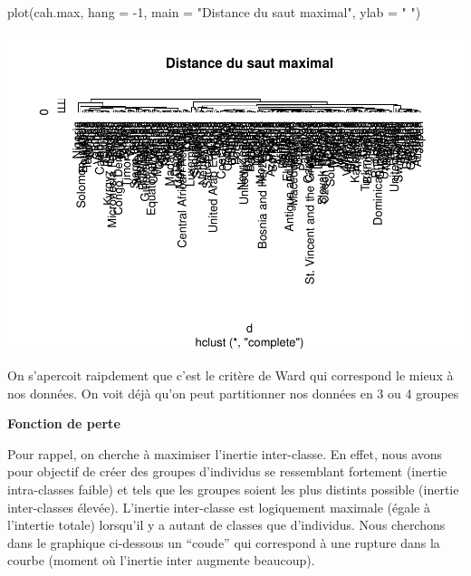 \documentclass[
]{article}
\newenvironment{Shaded}{}{}
\newcommand{\AttributeTok}[1]{#1}
\newcommand{\DecValTok}[1]{#1}
\newcommand{\FunctionTok}[1]{#1}
\newcommand{\NormalTok}[1]{#1}
\newcommand{\SpecialCharTok}[1]{\textcolor[rgb]{0.00,0.50,0.50}{#1}}
\newcommand{\StringTok}[1]{\textcolor[rgb]{0.00,0.50,0.50}{#1}}
\begin{document}
\begin{Shaded}
\begin{Highlighting}[]
\FunctionTok{plot}\NormalTok{(cah.max, }\AttributeTok{hang =} \SpecialCharTok{{-}}\DecValTok{1}\NormalTok{, }\AttributeTok{main =} \StringTok{"Distance du saut maximal"}\NormalTok{, }\AttributeTok{ylab =} \StringTok{" "}\NormalTok{)}
\end{Highlighting}
\end{Shaded}

\includegraphics{Projet_files/figure-latex/unnamed-chunk-13-1.pdf}

On s'apercoit raipdement que c'est le critère de Ward qui correspond le
mieux à nos données. On voit déjà qu'on peut partitionner nos données en
3 ou 4 groupes

\textbf{Fonction de perte}

Pour rappel, on cherche à maximiser l'inertie inter-classe. En effet,
nous avons pour objectif de créer des groupes d'individus se ressemblant
fortement (inertie intra-classes faible) et tels que les groupes soient
les plus distints possible (inertie inter-classes élevée). L'inertie
inter-classe est logiquement maximale (égale à l'intertie totale)
lorsqu'il y a autant de classes que d'individus. Nous cherchons dans le
graphique ci-dessous un ``coude'' qui correspond à une rupture dans la
courbe (moment où l'inertie inter augmente beaucoup).

\begin{Shaded}
\end{Shaded}
\end{document}
